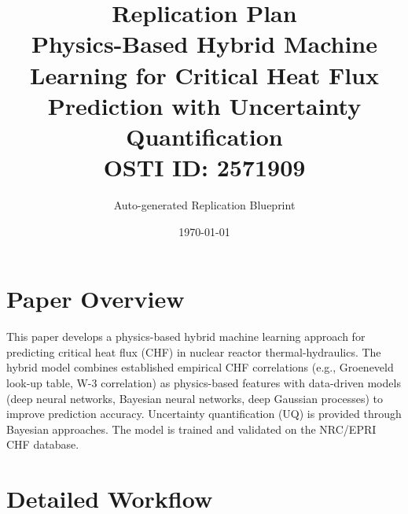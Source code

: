 \documentclass[11pt,a4paper]{article}
\title{\textbf{Replication Plan}\\[0.5em]
\large Physics-Based Hybrid Machine Learning for Critical Heat Flux Prediction with Uncertainty Quantification\\[0.3em]
\normalsize OSTI ID: 2571909}
\author{Auto-generated Replication Blueprint}
\date{\today}
\begin{document}
\maketitle
\tableofcontents
\newpage

\section{Paper Overview}
This paper develops a physics-based hybrid machine learning approach for predicting critical heat flux (CHF) in nuclear reactor thermal-hydraulics. The hybrid model combines established empirical CHF correlations (e.g., Groeneveld look-up table, W-3 correlation) as physics-based features with data-driven models (deep neural networks, Bayesian neural networks, deep Gaussian processes) to improve prediction accuracy. Uncertainty quantification (UQ) is provided through Bayesian approaches. The model is trained and validated on the NRC/EPRI CHF database.

\section{Detailed Workflow}
\end{document}
